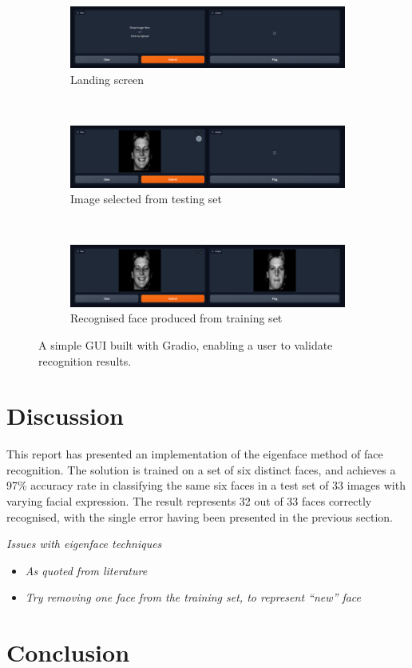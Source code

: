 \begin{figure}[ht]
  \centering
  \begin{subfigure}[b]{0.8\textwidth}
    \centering
    \includegraphics[width=\textwidth]{images/q3_gui_1.png}
    \caption{Landing screen}
  \end{subfigure}
  \\[1em]
  \begin{subfigure}[b]{0.8\textwidth}
    \centering
    \includegraphics[width=\textwidth]{images/q3_gui_2.png}
    \caption{Image selected from testing set}
  \end{subfigure}
  \\[1em]
  \begin{subfigure}[b]{0.8\textwidth}
    \centering
    \includegraphics[width=\textwidth]{images/q3_gui_3.png}
    \caption{Recognised face produced from training set}
  \end{subfigure}
  \caption{A simple GUI built with Gradio, enabling a user to validate recognition results.}
  \label{fig:gui}
\end{figure}

\newpage
\section{Discussion}

This report has presented an implementation of the eigenface method of face recognition. The solution is trained on a set of six distinct faces, and achieves a 97\% accuracy rate in classifying the same six faces in a test set of 33 images with varying facial expression. The result represents 32 out of 33 faces correctly recognised, with the single error having been presented in the previous section.

\textit{Issues with eigenface techniques}
\begin{itemize}
  \item \textit{As quoted from literature}
  \item \textit{Try removing one face from the training set, to represent ``new'' face}
\end{itemize}

\section{Conclusion}
